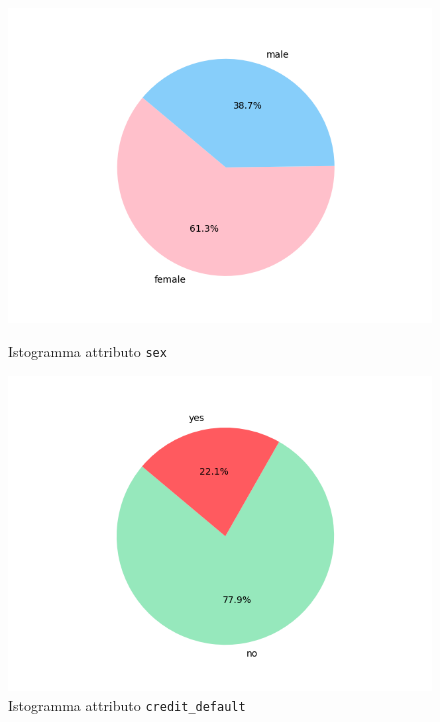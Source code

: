 \begin{figure}[H]
  \includegraphics[width=\linewidth]{img/sex-dist.png}
  \caption{Istogramma attributo \texttt{sex}}\label{sex-dist}
\endminipage\hfill
{}
  \includegraphics[width=\linewidth]{img/default-dist.png}
  \caption{Istogramma attributo \texttt{credit\_default}}\label{default-dist}
\endminipage\hfill
\end{figure}

